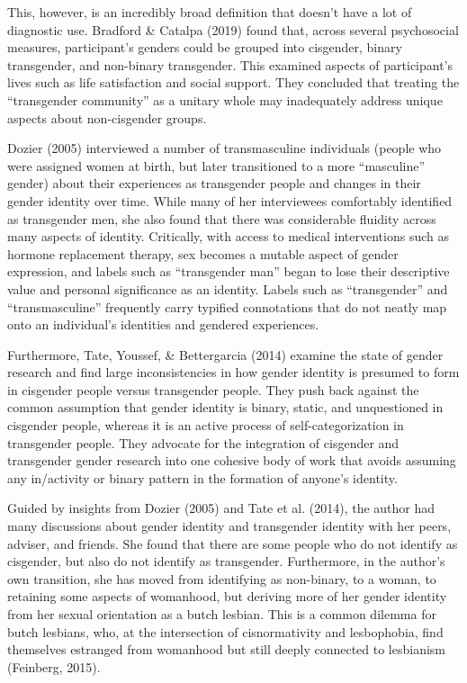 \documentclass[12pt,twoside]{reedthesis}
\begin{document}
This, however, is an incredibly broad definition that doesn't have a lot of diagnostic use. Bradford \& Catalpa (2019) found that, across several psychosocial measures, participant's genders could be grouped into cisgender, binary transgender, and non-binary transgender. This examined aspects of participant's lives such as life satisfaction and social support. They concluded that treating the ``transgender community'' as a unitary whole may inadequately address unique aspects about non-cisgender groups.

Dozier (2005) interviewed a number of transmasculine individuals (people who were assigned women at birth, but later transitioned to a more ``masculine'' gender) about their experiences as transgender people and changes in their gender identity over time. While many of her interviewees comfortably identified as transgender men, she also found that there was considerable fluidity across many aspects of identity. Critically, with access to medical interventions such as hormone replacement therapy, sex becomes a mutable aspect of gender expression, and labels such as ``transgender man'' began to lose their descriptive value and personal significance as an identity. Labels such as ``transgender'' and ``transmasculine'' frequently carry typified connotations that do not neatly map onto an individual's identities and gendered experiences.

Furthermore, Tate, Youssef, \& Bettergarcia (2014) examine the state of gender research and find large inconsistencies in how gender identity is presumed to form in cisgender people versus transgender people. They push back against the common assumption that gender identity is binary, static, and unquestioned in cisgender people, whereas it is an active process of self-categorization in transgender people. They advocate for the integration of cisgender and transgender gender research into one cohesive body of work that avoids assuming any in/activity or binary pattern in the formation of anyone's identity.

Guided by insights from Dozier (2005) and Tate et al. (2014), the author had many discussions about gender identity and transgender identity with her peers, adviser, and friends. She found that there are some people who do not identify as cisgender, but also do not identify as transgender. Furthermore, in the author's own transition, she has moved from identifying as non-binary, to a woman, to retaining some aspects of womanhood, but deriving more of her gender identity from her sexual orientation as a butch lesbian. This is a common dilemma for butch lesbians, who, at the intersection of cisnormativity and lesbophobia, find themselves estranged from womanhood but still deeply connected to lesbianism (Feinberg, 2015).
\end{document}
